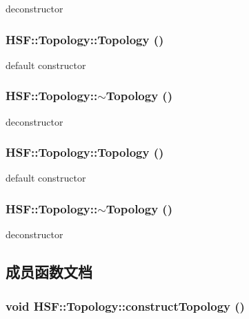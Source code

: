 deconstructor \hypertarget{classHSF_1_1Topology_a0248d01b1c87c4d1450771da9f841dee}{
\subsubsection[{Topology}]{\setlength{\rightskip}{0pt plus 5cm}HSF::Topology::Topology ()}}
\label{classHSF_1_1Topology_a0248d01b1c87c4d1450771da9f841dee}


default constructor \hypertarget{classHSF_1_1Topology_a16f4d3d8b4a870cbd26794a1c8d3cc5c}{
\subsubsection[{$\sim$Topology}]{\setlength{\rightskip}{0pt plus 5cm}HSF::Topology::$\sim$Topology ()}}
\label{classHSF_1_1Topology_a16f4d3d8b4a870cbd26794a1c8d3cc5c}


deconstructor \hypertarget{classHSF_1_1Topology_a0248d01b1c87c4d1450771da9f841dee}{
\subsubsection[{Topology}]{\setlength{\rightskip}{0pt plus 5cm}HSF::Topology::Topology ()}}
\label{classHSF_1_1Topology_a0248d01b1c87c4d1450771da9f841dee}


default constructor \hypertarget{classHSF_1_1Topology_a16f4d3d8b4a870cbd26794a1c8d3cc5c}{
\subsubsection[{$\sim$Topology}]{\setlength{\rightskip}{0pt plus 5cm}HSF::Topology::$\sim$Topology ()}}
\label{classHSF_1_1Topology_a16f4d3d8b4a870cbd26794a1c8d3cc5c}


deconstructor 

\subsection{成员函数文档}
\hypertarget{classHSF_1_1Topology_ab2ab89acd7b086d5b95a719f7869b896}{
\subsubsection[{constructTopology}]{\setlength{\rightskip}{0pt plus 5cm}void HSF::Topology::constructTopology ()}}
\label{classHSF_1_1Topology_ab2ab89acd7b086d5b95a719f7869b896}


